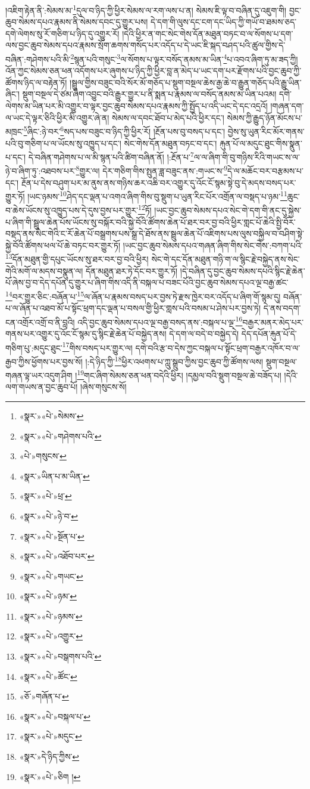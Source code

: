 །འཇིག་རྟེན་ནི་:སེམས་མ་\footnote{«སྣར་»«པེ་»སེམས་}དུལ་བ་ཉིད་ཀྱི་ཕྱིར་སེམས་ལ་རག་ལས་པ་ན། སེམས་ཇི་ལྟ་བ་བཞིན་དུ་འཇུག་གི། བྱང་ཆུབ་སེམས་དཔའ་རྣམས་ནི་སེམས་དབང་དུ་གྱུར་པས། དེ་དག་གི་ལུས་དང་ངག་དང་ཡིད་ཀྱི་གཡོ་བ་ཐམས་ཅད་དགེ་ལེགས་སུ་རོ་གཅིག་པ་ཉིད་དུ་འགྱུར་རོ། །དེའི་ཕྱིར་ན་གང་སེང་གེས་དོན་མཐུན་བཏང་བ་ལ་སོགས་པ་དག་ལས་བྱང་ཆུབ་སེམས་དཔའ་རྣམས་སྲོག་ཆགས་གསོད་པར་འདོད་པ་དེ་ཡང་ཇི་སྐད་བཤད་པའི་ཚུལ་གྱིས་དེ་བཞིན་:གཤེགས་པའི་མི་\footnote{«སྣར་»«པེ་»གཤེགས་པའི་}སྙན་པའི་གསུང་\footnote{«པེ་»གསུངས་}ལ་སོགས་པ་ལྟར་བསོད་ནམས་མ་ཡིན་\footnote{«སྣར་»ཡིན་པ་མ་ཡིན་}པ་འབའ་ཞིག་ཏུ་མ་ཟད་ཀྱི། འོན་ཀྱང་སེམས་ཅན་ཕན་འདོགས་པར་ཞུགས་པ་ཉིད་ཀྱི་ཕྱིར་བླ་ན་མེད་པ་ཡང་དག་པར་རྫོགས་པའི་བྱང་ཆུབ་ཀྱི་ཚོགས་ཉིད་ལ་བརྟེན་ཏོ། །སྦྲུལ་གྱིས་བཟུང་བའི་སོར་མོ་གཅོད་པ་སྡུག་བསྔལ་ཆེས་རྒྱ་ཆེ་བ་རྒྱུན་གཅོད་པའི་རྒྱུ་ཡིན་ཞིང་། སྡུག་བསྔལ་དེ་ཙམ་ཞིག་འབྱུང་བའི་རྒྱུར་གྱུར་པ་ནི་སྨན་པ་རྣམས་ལ་བསོད་ནམས་མ་ཡིན་པའམ། དགེ་ལེགས་མ་ཡིན་པར་མི་འགྱུར་བ་ལྟར་བྱང་ཆུབ་སེམས་དཔའ་རྣམས་ཀྱི་སྤྱོད་པ་འདི་ཡང་དེ་དང་འདྲའོ། །གཞན་དག་ལ་ཡང་དེ་ལྟར་ཅིའི་ཕྱིར་མི་འགྱུར་ཞེ་ན། སེམས་ལ་དབང་ཐོབ་པ་མེད་པའི་ཕྱིར་དང་། སེམས་ཀྱི་རྒྱུད་ཉོན་མོངས་པ་མཁྲང་\footnote{«སྣར་»«པེ་»ཕྲ་}ཞིང་:ཉེ་བར་\footnote{«སྣར་»«པེ་»ཉེ་བ་}སད་པས་བཟུང་བ་ཉིད་ཀྱི་ཕྱིར་རོ། །རྔོན་པས་བུ་བསད་པ་དང་། བྱེས་སུ་ཡུན་རིང་མོར་གནས་པའི་བུ་གཅིག་པ་ལ་ཡོངས་སུ་འཁྱུད་པ་དང་། སེང་གེས་དོན་མཐུན་བཏང་བ་དང་། རྐུན་པོ་ལ་མདུང་ཐུང་གིས་སྣུན་པ་དང་། དེ་བཞིན་གཤེགས་པ་ལ་མི་སྙན་པའི་ཚིག་བཞིན་ནོ། །:རྔོན་པ་\footnote{«སྣར་»«པེ་»སྔོན་པ་}ལ་ལ་ཞིག་གི་བུ་གཉིས་རིའི་གཡང་ས་ལ་ཉེ་བ་ཞིག་ཏུ་:འཐབས་པར་\footnote{«སྣར་»«པེ་»འཐོབ་པར་}གྱུར་ལ། དེར་གཅིག་གིས་སྤུན་ཟླ་བཟུང་ནས་:གཡང་ས་\footnote{«སྣར་»«པེ་»གཡང་}དེ་ལ་མཆོང་བར་བརྩམས་པ་དང་། རྔོན་པ་དེས་བཤུག་པར་མ་ནུས་ནས་གཉིས་ཆར་འཆི་བར་འགྱུར་དུ་འོང་ངོ་སྙམ་སྟེ་བུ་དེ་མདས་བསད་པར་གྱུར་ཏོ། །ཡང་ཉམས་\footnote{«སྣར་»«པེ་»ཉམ་}ཤེད་དང་ལྡན་པ་འགའ་ཞིག་གིས་བུ་སྡུག་པ་ཡུན་རིང་པོར་འགྲོན་ལ་བསྡད་པ་ཉམ་\footnote{«སྣར་»«པེ་»ཉམས་}ཆུང་བ་ཆེས་ཡོངས་སུ་འཁྱུད་པས་དེ་དུས་བྱས་པར་གྱུར་\footnote{«སྣར་»«པེ་»འགྱུར་}ཏོ། །ཡང་བྱང་ཆུབ་སེམས་དཔའ་སེང་གེ་དག་གི་ནང་དུ་སྐྱེས་པ་ཞིག་གི་སྦྲུལ་ཆེན་པོས་ཡོངས་སུ་བསྐོར་བའི་སྐྱེ་བོའི་ཚོགས་ཆེན་པོ་ཐར་བར་བྱ་བའི་ཕྱིར་གླང་པོ་ཆེའི་སྤྱི་བོར་བསྡད་ནས་སེང་གེའི་ང་རོ་ཆེན་པོ་བསྒྲགས་པས་སྒྲ་དེ་ཐོས་ནས་སྦྲུལ་ཆེན་པོ་འཇིགས་པས་ལུས་བསྐྱིལ་བ་བཤིག་སྟེ་སྐྱེ་བོའི་ཚོགས་ཕལ་པོ་ཆེ་བཏང་བར་གྱུར་ཏོ། །ཡང་བྱང་ཆུབ་སེམས་དཔའ་གཞན་ཞིག་གིས་སེང་གེས་:བཀག་པའི་\footnote{«སྣར་»«པེ་»བསྒགས་པའི་}དོན་མཐུན་གྱི་དཔུང་ཡོངས་སུ་ཐར་བར་བྱ་བའི་ཕྱིར། སེང་གེ་དང་དོན་མཐུན་གཉི་ག་ལ་སྙིང་རྗེ་བསྐྱེད་ནས་སེང་གེའི་མགོ་ལ་མདས་བསྣུན་ལ། དོན་མཐུན་ཐར་ཏེ་དོང་བར་གྱུར་ཏོ། །དེ་བཞིན་དུ་བྱང་ཆུབ་སེམས་དཔའི་སྙིང་རྗེ་ཆེན་པོ་ཞེས་བྱ་བ་དེད་དཔོན་དུ་གྱུར་པ་ཞིག་གིས་འདི་ནི་བསྐལ་པ་བཟང་པོའི་བྱང་ཆུབ་སེམས་དཔའ་ལྔ་བརྒྱ་ཚང་\footnote{«སྣར་»«པེ་»ཚོང་}བར་གྱུར་ཅིང་:བཞོན་པ་\footnote{«ཅོ་»གཞོན་པ་}ལ་ཞོན་པ་རྣམས་བསད་པར་བྱས་ཏེ་རྫས་ཁྱེར་བར་འདོད་པ་ཞིག་གོ་སྙམ་དུ། བཞོན་པ་ལ་ཞོན་པ་འཐབ་མོ་པ་སྟོང་ཕྲག་དང་ལྡན་པ་བསལ་གྱི་ཕྱིར་གླས་པའི་བསམ་པ་ཤེས་པར་བྱས་ཏེ། དེ་ནས་བདག་ངན་འགྲོར་འགྲོ་བ་ནི་བླའི། འདི་བྱང་ཆུབ་སེམས་དཔའ་ལྔ་བརྒྱ་བསད་ནས་:བསྐལ་པ་ལྔ་\footnote{«སྣར་»«པེ་»བསྐལ་པ་}བརྒྱར་མནར་མེད་པར་གནས་པར་འགྱུར་དུ་འོང་ངོ་སྙམ་དུ་སྙིང་རྗེ་ཆེན་པོ་བསྐྱེད་ནས། དེ་དག་ལ་བདེ་བ་བསྐྱེད་དེ། དེད་དཔོན་རྐུན་པོ་དེ་གཅིག་པུ་:མདུང་ཐུང་\footnote{«སྣར་»«པེ་»མདུང་}གིས་བསད་པར་གྱུར་ལ། དགེ་བའི་རྩ་བ་དེས་ཀྱང་བསྐལ་པ་སྟོང་ཕྲག་བརྒྱར་འཁོར་བ་ལ་རྒྱབ་ཀྱིས་ཕྱོགས་པར་བྱས་སོ། །:དེ་ཉིད་ཀྱི་\footnote{«སྣར་»དེ་ཉིད་ཀྱིས་}ཕྱིར་འཕགས་པ་ཀླུ་སྒྲུབ་ཀྱིས་བྱང་ཆུབ་ཀྱི་ཚོགས་ལས། སྡུག་བསྔལ་གཞན་ལྟ་ཡར་འདུག་ཤིག །\footnote{«སྣར་»«པེ་»ཅིག །}གང་ཞིག་སེམས་ཅན་ཕན་བདེའི་ཕྱིར། །དམྱལ་བའི་སྡུག་བསྔལ་ཆེ་བཟོད་པ། །དེའི་ལག་གཡས་ན་བྱང་ཆུབ་པོ། །ཞེས་གསུངས་སོ། 